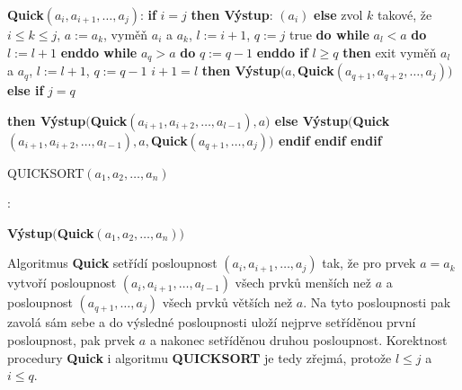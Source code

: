 \documentclass[a4paper,12pt]{article}
\begin{document}
{\bf Quick$(a_i,a_{i+1},\dots,a_j)$}:\newline 
{\bf if} $i=j$ {\bf then\newline 
\phantom{{\rm ---}}Výstup}: $(a_i)$\newline 
{\bf else\newline 
\phantom{{\rm ---}}}zvol $k$ takové, že $i\le k\le j$, $a:=a_k$, 
vyměň $a_i$ a $a_k$, $l:=i+1$, $q:=j$\newline 
\phantom{---}{\bf while} true {\bf do\newline 
\phantom{{\rm ------}}while} $a_l<a$ {\bf do} $l:=l+1$ {\bf enddo\newline 
\phantom{{\rm ------}}while} $a_q>a$ {\bf do} $q:=q-1$ {\bf enddo\newline 
\phantom{{\rm ------}}if} $l\ge q$ {\bf then\newline 
\phantom{{\rm ---------}}}exit\newline 
{}vyměň $a_l$ a $a_q$, $l:=l+1$, $q
:=q-1$\newline 
{} $i+1=l$ {\bf then\newline 
\phantom{{\rm ------}}Výstup$(a,$Quick$(a_{q+1},a_{q+2},\dots,a_
j))$\newline 
\phantom{{\rm ---}}else\newline 
\phantom{{\rm ------}}if} $j=q$ {\bf then\newline 
\phantom{{\rm ---------}}Výstup$($Quick$(a_{i+1},a_{i+2},\dots,
a_{l-1}),a)$\newline 
\phantom{{\rm ------}}else\newline 
\phantom{{\rm ---------}}Výstup$($Quick$(a_{i+1},a_{i+2},\dots,
a_{l-1}),a,$Quick$(a_{q+1},\dots,a_j))$\newline 
\phantom{{\rm ------}}endif\newline 
\phantom{{\rm ---}}endif\newline 
endif

QUICKSORT$(a_1,a_2,\dots,a_n)$}:\newline 
{\bf Výstup$($Quick$(a_1,a_2,\dots,a_n))$

}
Algoritmus {\bf Quick} setřídí posloupnost 
$(a_i,a_{i+1},\dots,a_j)$ tak, že pro prvek $a=a_k$ vytvoří posloupnost 
$(a_i,a_{i+1},\dots,a_{l-1})$ všech prvků menších než $
a$ 
a posloupnost
$(a_{q+1},\dots,a_j)$ všech prvků 
větších než $a$. Na tyto posloupnosti pak 
zavolá sám sebe a do výsledné posloupnosti uloží 
nejprve setříděnou první posloupnost, pak prvek $a$ a nakonec 
setříděnou druhou posloupnost. Korektnost procedury 
{\bf Quick}  i algoritmu {\bf QUICKSORT} je tedy zřejmá, protože 
$l\le j$ a $i\le q$. 
\end{document}
